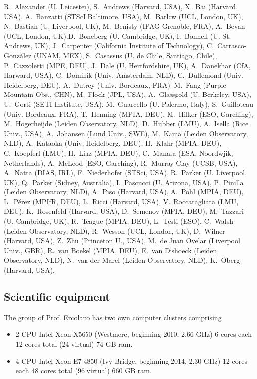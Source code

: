 \documentclass[10pt,fleqn,twoside]{article}
\newcommand{\Tcol}{\color{blue}}
\begin{document}
R.~Alexander (U. Leicester),
S.~Andrews (Harvard, USA),
X.~Bai (Harvard, USA),
A.~Banzatti (STScI Baltimore, USA),
M.~Barlow (UCL, London, UK),
N.~Bastian (U. Liverpool, UK),
M.~Benisty (IPAG Grenoble, FRA),
A.~Bevan (UCL, London, UK).D.~Boneberg (U. Cambridge, UK),
I.~Bonnell (U. St. Andrews, UK),
J.~Carpenter (California Institute of Technology),
C.~Carrasco-González (UNAM, MEX),
S.~Casassus (U. de Chile, Santiago, Chile),
P.~Cazzoletti (MPE, DEU),
J.~Dale (U. Hertfordshire, UK),
A.~Danekhar (CfA, Harward, USA),
C.~Dominik (Univ. Amsterdam, NLD),
C.~Dullemond (Univ. Heidelberg, DEU),
A.~Dutrey (Univ. Bordeaux, FRA),
M.~Fang (Purple Mountain Obs., CHN),
M.~Flock (JPL, USA),
A.~Glassgold (U. Berkeley, USA),
U.~Gorti (SETI Institute, USA),
M.~Guarcello (U. Palermo, Italy),
S.~Guilloteau (Univ. Bordeaux, FRA),
T.~Henning (MPIA, DEU),
M.~Hilker (ESO, Garching),
M.~Hogerheijde (Leiden Observatory, NLD),
D.~Hubber (LMU),
A.~Isella (Rice Univ., USA),
A.~Johansen (Lund Univ., SWE),
M.~Kama (Leiden Observatory, NLD),
A.~Kataoka (Univ. Heidelberg, DEU),
H.~Klahr (MPIA, DEU),
C.~Koepferl (LMU),
H.~Linz (MPIA, DEU),
C.~Manara (ESA, Noordwjik, Netherlands),
A.~McLeod (ESO, Garching),
R.~Murray-Clay (UCSB, USA),
A.~Natta (DIAS, IRL),
F.~Niederhofer (STSci, USA),
R.~Parker (U. Liverpool, UK),
Q.~Parker (Sidney, Australia),
I.~Pascucci (U. Arizona, USA),
P.~Pinilla (Leiden Observatory, NLD),
A.~Piso (Harvard, USA),
A.~Pohl (MPIA, DEU),
L.~Pérez (MPIfR, DEU),
L.~Ricci (Harvard, USA),
V.~Roccatagliata (LMU, DEU),
K.~Rosenfeld (Harvard, USA),
D.~Semenov (MPIA, DEU),
M.~Tazzari (U. Cambridge, UK),
R.~Teague (MPIA, DEU),
L.~Testi (ESO),
C.~Walsh (Leiden Observatory, NLD),
R.~Wesson (UCL, London, UK),
D.~Wilner (Harvard, USA),
Z.~Zhu (Princeton U., USA),
M.~de Juan Ovelar (Liverpool Univ., GBR),
R.~van Boekel (MPIA, DEU),
E.~van Dishoeck (Leiden Observatory, NLD),
N.~van der Marel (Leiden Observatory, NLD),
K.~Öberg (Harvard, USA),


\subsection{\Tcol Scientific equipment}

The group of Prof. Ercolano has two own computer clusters comprising 

\begin{itemize}
\item 2 CPU Intel Xeon X5650 (Westmere, beginning
2010, 2.66 GHz) 6 cores each 12 cores total (24 virtual) 74 GB ram.

\item 4 CPU Intel Xeon E7-4850 (Ivy Bridge, beginning 2014, 2.30 GHz)
12 cores each 48 cores total (96 virtual) 660 GB ram.

\end{itemize}
\end{document}
